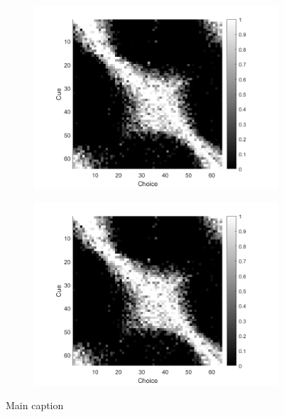 \begin{figure}
     \centering
     \begin{subfigure}[b]{0.45\textwidth}
         \centering
         \includegraphics[width=\textwidth]{../../../Figures/working/SimilarityMatrixPollux.png}
         \caption{}
         \label{fig:}
     \end{subfigure}
     \hfill
     \begin{subfigure}[b]{0.45\textwidth}
         \centering
         \includegraphics[width=\textwidth]{../../../Figures/working/SimilarityMatrixPollux.png}
         \caption{}
         \label{fig:}
     \end{subfigure}
        \caption{Main caption}
        \label{fig:main}
\end{figure}

